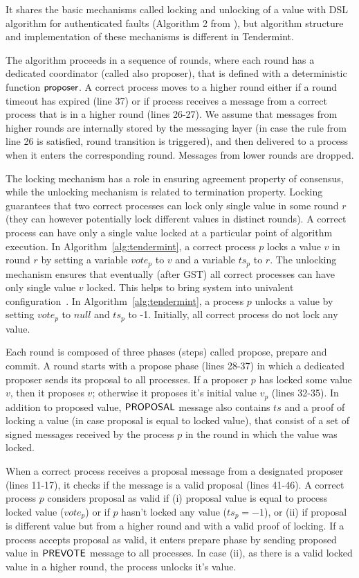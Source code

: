 It shares the basic mechanisms called locking and unlocking of a value with DSL algorithm for authenticated faults (Algorithm 2 from \cite{DLS88:jacm}), but algorithm structure and implementation of these mechanisms is different in Tendermint. 

The algorithm proceeds in a sequence of rounds, where each round has a dedicated coordinator (called also proposer), that is defined with a deterministic function $\mathsf{proposer}$. A correct process moves to a higher round either if a round timeout has expired (line 37) or if process receives a message from a correct process that is in a higher round (lines 26-27). We assume that messages from higher rounds are internally stored by the messaging layer (in case the rule from line 26 is satisfied, round transition is triggered), and then delivered to a process when it enters the corresponding round. Messages from lower rounds are dropped.  

The locking mechanism has a role in ensuring agreement property of consensus, while the unlocking mechanism is related to termination property. Locking guarantees that two correct processes can lock only single value in some round $r$ (they can however potentially lock different values in distinct rounds). A correct process can have only a single value locked at a particular point of algorithm execution. In Algorithm~\ref{alg:tendermint}, a correct process $p$ locks a value $v$ in round $r$ by setting a variable $vote_p$ to $v$ and a variable $ts_p$ to $r$. The unlocking mechanism ensures that eventually (after GST) all correct processes can have only single value $v$ locked. This helps to bring system into univalent configuration~\cite{FLP85:jacm}. In Algorithm~\ref{alg:tendermint}, a process $p$ unlocks a value by setting $vote_p$ to $null$ and $ts_p$ to -1. Initially, all correct process do not lock any value.

Each round is composed of three phases (steps) called propose, prepare and commit. A round starts with a propose phase (lines 28-37) in which a dedicated proposer sends its proposal to all processes. If a proposer $p$ has locked some value $v$, then it proposes $v$; otherwise it proposes it's initial value $v_p$ (lines 32-35). In addition to proposed value, $\mathsf{PROPOSAL}$ message also contains $ts$ and a proof of locking a value (in case proposal is equal to locked value), that consist of a set of signed messages received by the process $p$ in the round in which the value was locked. 

When a correct process receives a proposal message from a designated proposer (lines 11-17), it checks if the message is a valid proposal (lines 41-46). A correct process $p$ considers proposal as valid if (i) proposal value is equal to process locked value ($vote_p$) or if $p$ hasn't locked any value ($ts_p = -1$), or (ii) if proposal is different value but from a higher round and with a valid proof of locking. If a process accepts proposal as valid, it enters prepare phase by sending proposed value in $\mathsf{PREVOTE}$ message to all processes. In case (ii), as there is a valid locked value in a higher round, the process unlocks it's value.  

